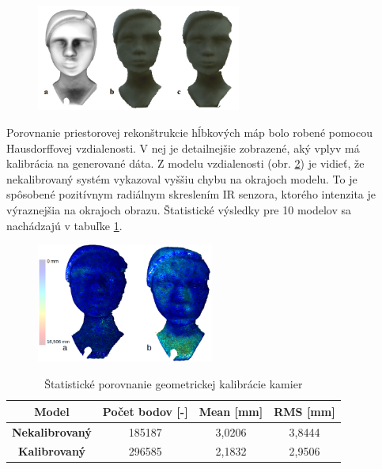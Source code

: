 \begin{figure}[H]
	\centering
	\includegraphics[width=0.6\textwidth]{figures/calibration_models.jpg}
	\caption{}
	\label{fig:calib:models}
\end{figure}

Porovnanie priestorovej rekonštrukcie hĺbkových máp bolo robené pomocou Hausdorffovej vzdialenosti. V nej je detailnejšie zobrazené, aký vplyv má kalibrácia na generované dáta. Z modelu vzdialenosti (obr. \ref{fig:calib:haus:single}) je vidieť, že nekalibrovaný systém vykazoval vyššiu chybu na okrajoch modelu. To je spôsobené pozitívnym radiálnym skreslením IR senzora, ktorého intenzita je výraznejšia na okrajoch obrazu. Štatistické výsledky pre 10 modelov sa nachádzajú v tabuľke \ref{tab:calib:single}.

\begin{figure}[H]
	\centering
	\includegraphics[width=0.52\textwidth]{figures/calibration_hausdorff_single.jpg}
	\caption{}
	\label{fig:calib:haus:single}
\end{figure}



\begin{table}[h]
	\caption{\label{tab:calib:single} Štatistické porovnanie geometrickej kalibrácie kamier }
	\centering
	\begin{tabular}{cccc}
		\toprule
		\textbf{Model} & \textbf{Počet bodov [-]} & \textbf{Mean [mm]} & \textbf{RMS [mm]} \\ 
		\midrule
		\textbf{Nekalibrovaný} & 185187 & 3,0206	& 3,8444 \\
		\textbf{Kalibrovaný} & 296585   & 2,1832   & 2,9506  \\  
		\bottomrule
	\end{tabular}
\end{table}

